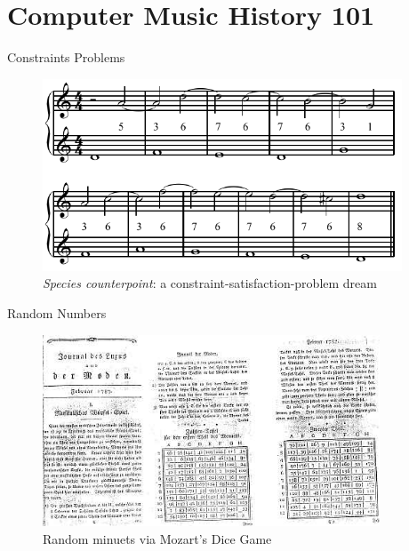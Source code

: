 \section{Computer Music History 101}

\begin{frame}{Constraints Problems}
    \begin{figure}
    \begin{centering}
    \includegraphics[height=2.25in]{assets/include-species-counterpoint.png}
    \caption{\emph{Species counterpoint}: a constraint-satisfaction-problem dream}
    \end{centering}
    \end{figure}
\end{frame}

\begin{frame}{Random Numbers}
    \begin{figure}
    \begin{centering}
    \includegraphics[height=2.25in]{assets/include-dice-game.jpg}
    \caption{Random minuets via Mozart's Dice Game}
    \end{centering}
    \end{figure}
\end{frame}

